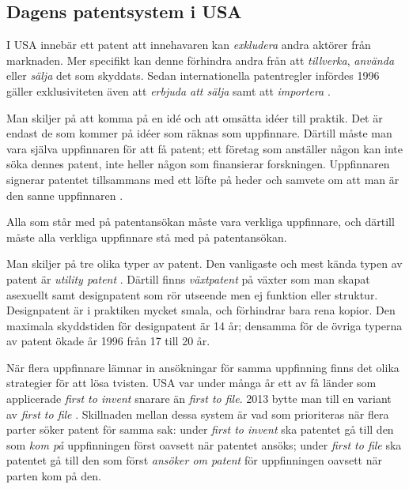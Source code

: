 \subsection{Dagens patentsystem i USA}

I USA innebär ett patent att innehavaren kan \emph{exkludera} andra aktörer från marknaden. Mer specifikt kan denne förhindra andra från att \emph{tillverka}, \emph{använda} eller \emph{sälja} det som skyddats. Sedan internationella patentregler infördes 1996 gäller exklusiviteten även att \emph{erbjuda att sälja} samt att \emph{importera} \cite{cmu-overview}.

Man skiljer på att komma på en idé och att omsätta idéer till praktik. Det är endast de som kommer på idéer som räknas som uppfinnare. Därtill måste man vara själva uppfinnaren för att få patent; ett företag som anställer någon kan inte söka dennes patent, inte heller någon som finansierar forskningen. Uppfinnaren signerar patentet tillsammans med ett löfte på heder och samvete om att man är den sanne uppfinnaren \cite{cmu-overview}.

Alla som står med på patentansökan måste vara verkliga uppfinnare, och därtill måste alla verkliga uppfinnare stå med på patentansökan.

Man skiljer på tre olika typer av patent. Den vanligaste och mest kända typen av patent är \emph{utility patent} \cite{cmu-overview}.
Därtill finns \emph{växtpatent} på växter som man skapat asexuellt samt designpatent som rör utseende men ej funktion eller struktur. Designpatent är i praktiken mycket smala, och förhindrar bara rena kopior. Den maximala skyddstiden för designpatent är 14 år; densamma för de övriga typerna av patent ökade år 1996 från 17 till 20 år.

När flera uppfinnare lämnar in ansökningar för samma uppfinning finns det olika strategier för att lösa tvisten. USA var under många år ett av få länder som applicerade \emph{first to invent} snarare än \emph{first to file}. 2013 bytte man till en variant av \emph{first to file} \cite{kravets}. Skillnaden mellan dessa system är vad som prioriteras när flera parter söker patent för samma sak: under \emph{first to invent} ska patentet gå till den som \emph{kom på} uppfinningen först oavsett när patentet ansöks; under \emph{first to file} ska patentet gå till den som först \emph{ansöker om patent} för uppfinningen oavsett när parten kom på den.

